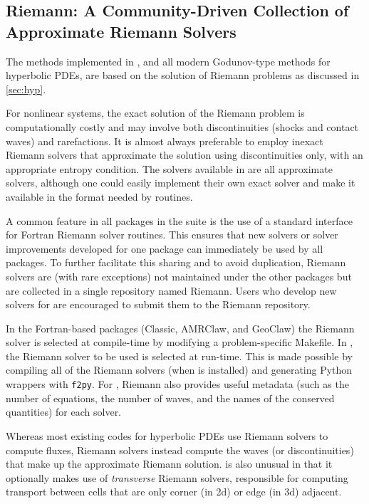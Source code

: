 %
%

\subsection{Riemann: A Community-Driven Collection of Approximate Riemann
Solvers}\label{sec:riemann}

The methods implemented in \clawpack, and all modern Godunov-type methods for
hyperbolic PDEs, are based on the solution of Riemann problems as discussed
in \cref{sec:hyp}.

For nonlinear systems, the exact solution of the Riemann problem is
computationally costly and may involve both discontinuities (shocks and contact
waves) and rarefactions.  It is almost always preferable to employ inexact
Riemann solvers that approximate the solution using discontinuities only, with
an appropriate entropy condition.  The solvers available in \clawpack are
all approximate solvers, although one could easily implement their own exact
solver and make it available in the format needed by \clawpack routines.

A common feature in all packages in the \clawpack suite is the
use of a standard interface for Fortran Riemann solver routines.  This ensures that new
solvers or solver improvements developed for one package can immediately
be used by all packages.  To further facilitate this sharing and to avoid
duplication, Riemann solvers are (with rare exceptions) not maintained under
the other packages but are collected in a single repository named Riemann.
Users who develop new solvers for \clawpack are encouraged to submit them to the
Riemann repository.

In the Fortran-based packages (Classic, AMRClaw, and GeoClaw) the Riemann solver
is selected at compile-time by modifying a problem-specific Makefile. In
\pyclaw, the Riemann solver to be used is selected at run-time.  This is made
possible by compiling all of the Riemann solvers (when \pyclaw is installed) and
generating Python wrappers with \texttt{f2py}.  For \pyclaw, Riemann also
provides useful metadata (such as the number of equations, the number of waves,
and the names of the conserved quantities) for each solver.  

Whereas most existing codes for hyperbolic PDEs use Riemann solvers to
compute fluxes, \clawpack Riemann solvers instead compute the waves
(or discontinuities) that make up the approximate Riemann solution.
\clawpack is also unusual in that it optionally makes use of {\em transverse}
Riemann solvers, responsible for computing transport between cells that
are only corner (in 2d) or edge (in 3d) adjacent.
